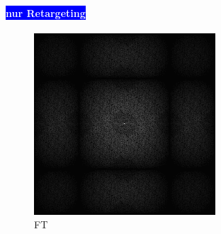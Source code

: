 \begin{figure}[H]
  \begin{tcolorbox}[boxrule=4pt,sharp corners=downhill,title=Szene unter Kamerabewegung, fonttitle=\bfseries]
    \paragraph{\hfill\colorbox{blue}{\textcolor{white}{nur Retargeting}}}
    \centering
    \begin{subfigure}[b]{0.2\linewidth}
      \includegraphics[width=\linewidth]{content/TemporalerAlg/Bilder/Reprojection/NoTemporalRepr/Ausschnitte/Ausschnitt1_FFT.png}
       \caption{FT}
       \label{pic:NoTemporalRepr_1_FFT}
    \end{subfigure}
    \begin{subfigure}[b]{0.2\linewidth}

\end{subfigure}
\end{tcolorbox}
\end{figure}
